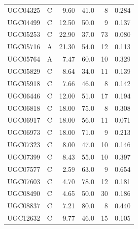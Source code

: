 \documentclass[11pt]{article}
\begin{document}
\begin{longtable}{llrrrr}
UGC04325 & C & 9.60 & 41.0 & 8 & 0.284\\
UGC04499 & C & 12.50 & 50.0 & 9 & 0.137\\
UGC05253 & C & 22.90 & 37.0 & 73 & 0.080\\
UGC05716 & A & 21.30 & 54.0 & 12 & 0.113\\
UGC05764 & A & 7.47 & 60.0 & 10 & 0.329\\
UGC05829 & C & 8.64 & 34.0 & 11 & 0.139\\
UGC05918 & C & 7.66 & 46.0 & 8 & 0.142\\
UGC06446 & C & 12.00 & 51.0 & 17 & 0.194\\
UGC06818 & C & 18.00 & 75.0 & 8 & 0.308\\
UGC06917 & C & 18.00 & 56.0 & 11 & 0.071\\
UGC06973 & C & 18.00 & 71.0 & 9 & 0.213\\
UGC07323 & C & 8.00 & 47.0 & 10 & 0.146\\
UGC07399 & C & 8.43 & 55.0 & 10 & 0.397\\
UGC07577 & C & 2.59 & 63.0 & 9 & 0.654\\
UGC07603 & C & 4.70 & 78.0 & 12 & 0.181\\
UGC08490 & C & 4.65 & 50.0 & 30 & 0.186\\
UGC08837 & C & 7.21 & 80.0 & 8 & 0.440\\
UGC12632 & C & 9.77 & 46.0 & 15 & 0.105\\
\bottomrule
\end{longtable}



\end{document}

